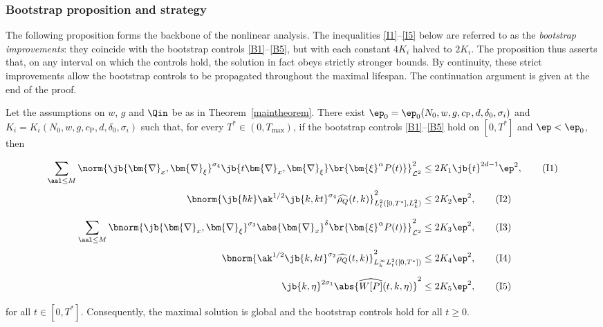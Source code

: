 \subsubsection{Bootstrap proposition and strategy}\label{conclusionsection}
The following proposition forms the backbone of the nonlinear analysis. The inequalities \eqref{I1}--\eqref{I5} below are referred to as the \textit{bootstrap improvements}: they coincide with the bootstrap controls \eqref{B1}--\eqref{B5}, but with each constant $4K_i$ halved to $2K_i$. The proposition thus asserts that, on any interval on which the controls hold, the solution in fact obeys strictly stronger bounds. By continuity, these strict improvements allow the bootstrap controls to be propagated throughout the maximal lifespan. The continuation argument is given at the end of the proof.
\begin{proposition}[Bootstrap]\label{bootstrapprop}
Let the assumptions on $w$, $g$ and $\Qin$ be as in Theorem~\ref{maintheorem}. There exist $\ep_0=\ep_0(N_0,w,g,{c_{\mathrm{P}}},d,\delta_0,\sigma_i)$ and $K_i=K_i(N_0,w,g,{c_{\mathrm{P}}},d,\delta_0,\sigma_i)$ such that, for every $T^*\in(0,T_{\max})$, if the bootstrap controls \eqref{B1}--\eqref{B5} hold on $[0,T^*]$ and $\ep<\ep_0$, then
\begin{align}
\sum_{\aal\leq M}\norm{\jb{\bm{\nabla}_x,\bm{\nabla}_\xi}^{\sigma_4}\jb{t\bm{\nabla}_x,\bm{\nabla}_\xi}\br{\bm{\xi}^\alpha P(t)}}_{\mathcal L^2}^2&\leq 2K_1\jb{t}^{2d-1}\ep^2,\vphantom{\int_a^b}\tag{I1}\label{I1}\\
\bnorm{\jb{\hbar k}\ak^{1/2}\jb{k,kt}^{\sigma_4}\widehat{\rho_Q}(t,k)}_{L^2_{t}([0,T^*],L^2_k)}^2&\leq 2K_2\ep^2,\vphantom{\int_a}\tag{I2}\label{I2}\\
\sum_{\aal\leq M}\bnorm{\jb{\bm{\nabla}_x,\bm{\nabla}_\xi}^{\sigma_3}\abs{\bm{\nabla}_x}^\delta \br{\bm{\xi}^\alpha P(t)}}_{\mathcal L^2}^2&\leq 2K_3\ep^2,\vphantom{\int_a^b}\tag{I3}\label{I3}\\
\bnorm{\ak^{1/2}\jb{k,kt}^{\sigma_2}\widehat{\rho_{Q}}(t,k)}_{L^\infty_kL^2_{t}([0,T^*])}^2&\leq 2K_4\ep^2,\vphantom{\int_a}\tag{I4}\label{I4}\\
\jb{k,\eta}^{2\sigma_1}\abs{\widehat{W[P]}(t,k,\eta)}^2&\leq 2K_5\ep^2,\vphantom{\int_a^b}\tag{I5}\label{I5}
\end{align}for all $t\in[0,T^*]$. Consequently, the maximal solution is global and the bootstrap controls hold for all $t\geq0$.
\end{proposition}

